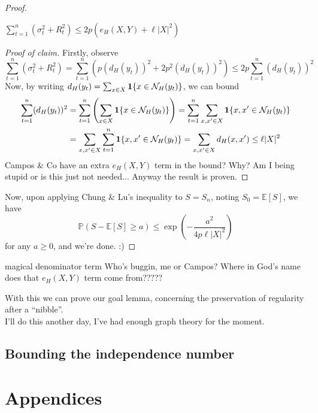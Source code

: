 \documentclass{article}
\begin{document}
\begin{proof}
    \begin{claim}
        $\sum_{t=1}^n(\sigma_t^2 + R_t^2) \leq 2p(e_H(X, Y) + \ell |X|^2)$
    \end{claim}
    \begin{proof}[Proof of claim]
        Firstly, observe 
        \[\sum_{t=1}^n(\sigma_t^2 + R_t^2) = \sum_{t=1}^n(p(d_H(y_t))^2 + 2p^2(d_H(y_t))^2) \leq 2p\sum_{t=1}^n (d_H(y_t))^2\]
        Now, by writing $d_H(y_t) = \sum_{x \in X}{\bf 1}\{x \in \mathcal{N}_H(y_t)\}$, we can bound 
        \begin{align*}
            \sum_{t=1}^n (d_H(y_t))^2 &= \sum_{t=1}^n \left(\sum_{x \in X}{\bf 1}\{x \in \mathcal{N}_H(y_t)\}\right) 
            = \sum_{t=1}^n \sum_{x, x^\prime \in X}{\bf 1}\{x, x^\prime \in \mathcal{N}_H(y_t)\} \\ 
            &= \sum_{x, x^\prime \in X} \sum_{t=1}^n {\bf 1}\{x, x^\prime \in \mathcal{N}_H(y_t)\} 
            = \sum_{x, x^\prime \in X}d_H(x, x^\prime) \leq \ell |X|^2
        \end{align*}
        Campos $\&$ Co have an extra $e_H(X,Y)$ term in the bound? Why? Am I being stupid or is this just not 
        needed$\dots$ Anyway the result is proven. 
    \end{proof}
    Now, upon applying Chung $\&$ Lu's inequality to $S = S_n$, noting $S_0 = \mathbb{E}[S]$, we have 
    \[\mathbb{P}(S - \mathbb{E}[S] \geq a) \leq \exp\left(-\frac{a^2}{4p\ell |X|^2}\right)\]
    for any $a \geq 0$, and we're done. :)
\end{proof}

\begin{remark}[]{magical denominator term}
    Who's buggin, me or Campos? Where in God's name does that $e_H(X,Y)$ term come from????? 
\end{remark}

With this we can prove our goal lemma, concerning the preservation of regularity after a ``nibble''. \\

I'll do this another day, I've had enough graph theory for the moment. 

\subsection{Bounding the independence number}

\newpage

\section{Appendices}
\end{document}
